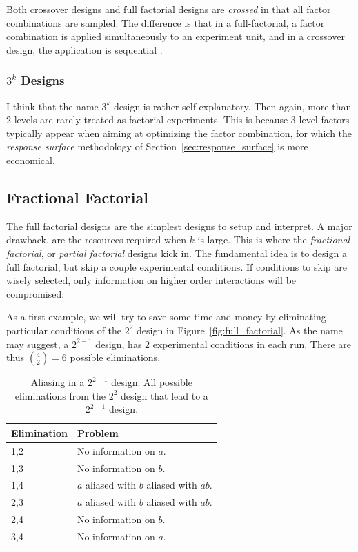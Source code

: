 \begin{remark}
Both crossover designs and full factorial designs are \emph{crossed} in that all factor combinations are sampled. 
The difference is that in a full-factorial, a factor combination is applied simultaneously to an experiment unit, and in a crossover design, the application is sequential \citep{everitt_cambridge_2010}.
\end{remark}



\subsubsection{$3^k$ Designs}
I think that the name $3^k$ design is rather self explanatory.
Then again, more than $2$ levels are rarely treated as factorial experiments. 
This is because $3$ level factors typically appear when aiming at optimizing the factor combination, for which the \emph{response surface} methodology of Section~\ref{sec:response_surface} is more economical.




\subsection{Fractional Factorial}
The full factorial designs are the simplest designs to setup and interpret. 
A major drawback, are the resources required when $k$ is large. 
This is where the \emph{fractional factorial}, or \emph{partial factorial} designs kick in.
The fundamental idea is to design a full factorial, but skip a couple experimental conditions. If conditions to skip are wisely selected, only information on higher order interactions will be compromised.


\begin{example}[From $2^2$ to $2^{(2-1)}$]
\label{eg:fractional_factorial}
As a first example, we will try to save some time and money by eliminating particular conditions of the $2^2$ design in Figure~\ref{fig:full_factorial}.
As the name may suggest, a $2^{2-1}$ design, has $2$ experimental conditions in each run. 
There are thus $\binom{4}{2}=6$ possible eliminations.
\begin{table}[ht]
\begin{tabular}{|p{2.5cm}|p{10cm}|}
\hline Elimination &  Problem \\ 
\hline
\hline 1,2 &  No information on $a$. \\ 
\hline 1,3 &  No information on $b$.\\ 
\hline 1,4 &  $a$ aliased with $b$ aliased with $ab$. \\ 
\hline 2,3 &  $a$ aliased with $b$ aliased with $ab$. \\ 
\hline 2,4 &  No information on $b$. \\ 
\hline 3,4 &  No information on $a$.\\ 
\hline 
\end{tabular} 
\label{tab:partial_factorial}
\caption[Aliasing]{Aliasing in a $2^{2-1}$ design: All possible eliminations from the $2^2$ design that lead to a $2^{2-1}$ design.}
\end{table}
\end{example}


